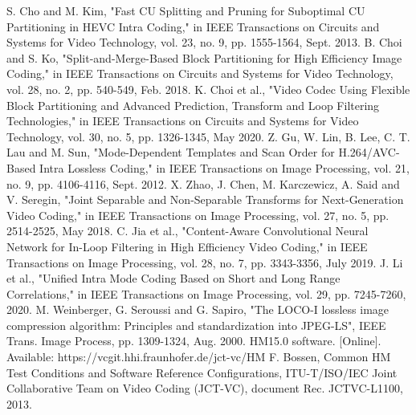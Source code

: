 \documentclass[journal]{IEEEtran}
\begin{document}
\begin{thebibliography}{11}
S. Cho and M. Kim, "Fast CU Splitting and Pruning for Suboptimal CU Partitioning in HEVC Intra Coding," in IEEE Transactions on Circuits and Systems for Video Technology, vol. 23, no. 9, pp. 1555-1564, Sept. 2013.
B. Choi and S. Ko, "Split-and-Merge-Based Block Partitioning for High Efficiency Image Coding," in IEEE Transactions on Circuits and Systems for Video Technology, vol. 28, no. 2, pp. 540-549, Feb. 2018.
K. Choi et al., "Video Codec Using Flexible Block Partitioning and Advanced Prediction, Transform and Loop Filtering Technologies," in IEEE Transactions on Circuits and Systems for Video Technology, vol. 30, no. 5, pp. 1326-1345, May 2020.
Z. Gu, W. Lin, B. Lee, C. T. Lau and M. Sun, "Mode-Dependent Templates and Scan Order for H.264/AVC-Based Intra Lossless Coding," in IEEE Transactions on Image Processing, vol. 21, no. 9, pp. 4106-4116, Sept. 2012.
X. Zhao, J. Chen, M. Karczewicz, A. Said and V. Seregin, "Joint Separable and Non-Separable Transforms for Next-Generation Video Coding," in IEEE Transactions on Image Processing, vol. 27, no. 5, pp. 2514-2525, May 2018.
C. Jia et al., "Content-Aware Convolutional Neural Network for In-Loop Filtering in High Efficiency Video Coding," in IEEE Transactions on Image Processing, vol. 28, no. 7, pp. 3343-3356, July 2019.
J. Li et al., "Unified Intra Mode Coding Based on Short and Long Range Correlations," in IEEE Transactions on Image Processing, vol. 29, pp. 7245-7260, 2020.
M. Weinberger, G. Seroussi and G. Sapiro, "The LOCO-I lossless image compression algorithm: Principles and standardization into JPEG-LS", IEEE Trans. Image Process, pp. 1309-1324, Aug. 2000.
HM15.0 software. [Online]. Available: https://vcgit.hhi.fraunhofer.de/jct-vc/HM
F. Bossen, Common HM Test Conditions and Software Reference Configurations, ITU-T/ISO/IEC Joint Collaborative Team on Video Coding (JCT-VC), document Rec. JCTVC-L1100, 2013.






\end{thebibliography}
\end{document}
